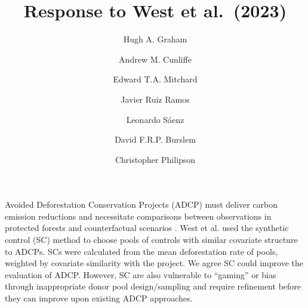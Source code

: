 \documentclass[
  number,
  3p]{elsarticle}
\begin{document}
\begin{frontmatter}
\title{Response to West et al.~(2023)}
\author[1,2]{Hugh A. Graham%
%
}
\author[2]{Andrew M. Cunliffe%
%
}

\author[3]{Edward T.A. Mitchard%
%
}

\author[1]{Javier Ruiz Ramos%
%
}

\author[1]{Leonardo Sáenz%
%
}

\author[4]{David F.R.P. Burslem%
%
}

\author[1]{Christopher Philipson%
%
}









        





\end{frontmatter}
    \ifdefined\Shaded\renewenvironment{Shaded}{\begin{tcolorbox}[frame hidden, sharp corners, breakable, interior hidden, boxrule=0pt, enhanced, borderline west={3pt}{0pt}{shadecolor}]}{\end{tcolorbox}}\fi

Avoided Deforestation Conservation Projects (ADCP) must deliver carbon
emission reductions and necessitate comparisons between observations in
protected forests and counterfactual scenarios
\citep{balmford_realizing_2023}. West et al. \citep{west_action_2023}
used the synthetic control (SC) method to choose pools of controls with
similar covariate structure to ADCPs. SCs were calculated from the mean
deforestation rate of pools, weighted by covariate similarity with the
project. We agree SC could improve the evaluation of ADCP. However, SC
are also vulnerable to ``gaming'' or bias through inappropriate donor
pool design/sampling and require refinement
\citep{balmford_realizing_2023} before they can improve upon existing
ADCP approaches.
\end{document}
